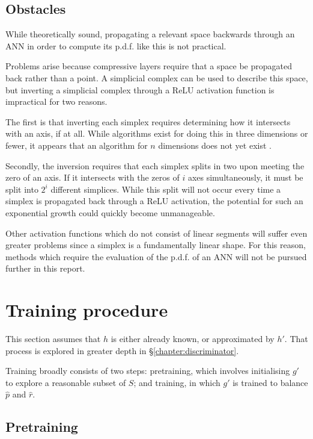 \documentclass[../../main.tex]{subfiles}
\begin{document}
\subsection{Obstacles} \label{subsection:obstacles}

While theoretically sound, propagating a relevant space backwards through an ANN in order to compute its p.d.f. like this is not practical.

Problems arise because compressive layers require that a space be propagated back rather than a point.
A simplicial complex can be used to describe this space, but inverting a simplicial complex through a ReLU activation function is impractical for two reasons.

The first is that inverting each simplex requires determining how it intersects with an axis, if at all.
While algorithms exist for doing this in three dimensions or fewer, it appears that an algorithm for $n$ dimensions does not yet exist \cite{wildberger12}.

Secondly, the inversion requires that each simplex splits in two upon meeting the zero of an axis.
If it intersects with the zeros of $i$ axes simultaneously, it must be split into $2^i$ different simplices.
While this split will not occur every time a simplex is propagated back through a ReLU activation, the potential for such an exponential growth could quickly become unmanageable.

Other activation functions which do not consist of linear segments will suffer even greater problems since a simplex is a fundamentally linear shape.
For this reason, methods which require the evaluation of the p.d.f. of an ANN will not be pursued further in this report.

\section{Training procedure} \label{section:generatorTrainingProcedure}

This section assumes that $h$ is either already known, or approximated by $h'$.
That process is explored in greater depth in \S\ref{chapter:discriminator}.

Training broadly consists of two steps: pretraining, which involves initialising $g'$ to explore a reasonable subset of $S$; and training, in which $g'$ is trained to balance $\hat{p}$ and $\hat{r}$.

\subsection{Pretraining} \label{subsection:pretraining}
\end{document}
